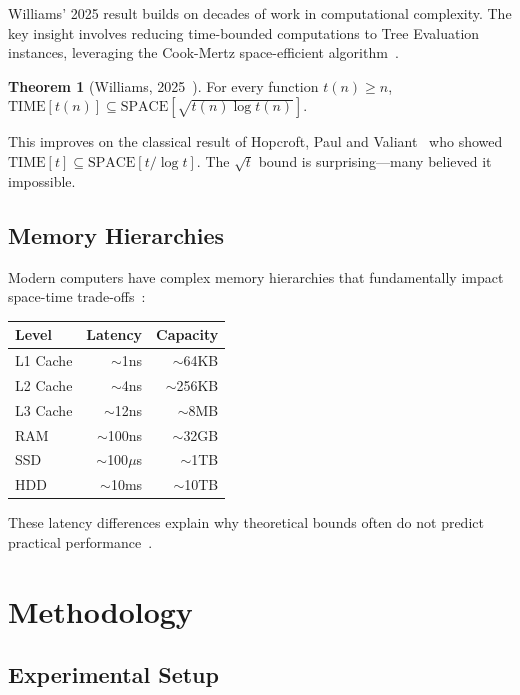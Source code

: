 \documentclass[11pt]{article}
\theoremstyle{definition}
\newtheorem{theorem}{Theorem}
\begin{document}
Williams' 2025 result builds on decades of work in computational complexity. The key insight involves reducing time-bounded computations to Tree Evaluation instances, leveraging the Cook-Mertz space-efficient algorithm~\cite{cookmertz2024}.

\begin{theorem}[Williams, 2025~\cite{williams2025}]
For every function $t(n) \geq n$,\\
$\text{TIME}[t(n)] \subseteq \text{SPACE}[\sqrt{t(n) \log t(n)}]$.
\end{theorem}

This improves on the classical result of Hopcroft, Paul and Valiant~\cite{hpv1977} who showed $\text{TIME}[t] \subseteq \text{SPACE}[t/\log t]$. The $\sqrt{t}$ bound is surprising---many believed it impossible.

\subsection{Memory Hierarchies}

Modern computers have complex memory hierarchies that fundamentally impact space-time trade-offs~\cite{vitter2008}:

\begin{center}
\begin{tabular}{lrr}
\toprule
Level & Latency & Capacity \\
\midrule
L1 Cache & $\sim$1ns & $\sim$64KB \\
L2 Cache & $\sim$4ns & $\sim$256KB \\
L3 Cache & $\sim$12ns & $\sim$8MB \\
RAM & $\sim$100ns & $\sim$32GB \\
SSD & $\sim$100$\mu$s & $\sim$1TB \\
HDD & $\sim$10ms & $\sim$10TB \\
\bottomrule
\end{tabular}
\end{center}

These latency differences explain why theoretical bounds often do not predict practical performance~\cite{patrascu2006}.

\section{Methodology}
\label{sec:methodology}

\subsection{Experimental Setup}
\end{document}
